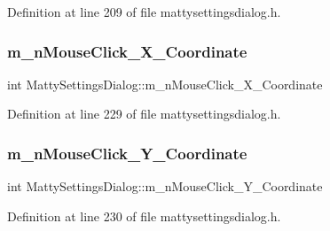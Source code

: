 Definition at line 209 of file mattysettingsdialog.\+h.

\hypertarget{classMattySettingsDialog_a0a19e3bafbfb97c643edfa372dd01795}{}\label{classMattySettingsDialog_a0a19e3bafbfb97c643edfa372dd01795} 
\subsubsection{\texorpdfstring{m\+\_\+n\+Mouse\+Click\+\_\+\+X\+\_\+\+Coordinate}{m\_nMouseClick\_X\_Coordinate}}
{\footnotesize\ttfamily int Matty\+Settings\+Dialog\+::m\+\_\+n\+Mouse\+Click\+\_\+\+X\+\_\+\+Coordinate\hspace{0.3cm}{\ttfamily [private]}}



Definition at line 229 of file mattysettingsdialog.\+h.

\hypertarget{classMattySettingsDialog_a7e437ff929a372a8a9bccdb8d3463b10}{}\label{classMattySettingsDialog_a7e437ff929a372a8a9bccdb8d3463b10} 
\subsubsection{\texorpdfstring{m\+\_\+n\+Mouse\+Click\+\_\+\+Y\+\_\+\+Coordinate}{m\_nMouseClick\_Y\_Coordinate}}
{\footnotesize\ttfamily int Matty\+Settings\+Dialog\+::m\+\_\+n\+Mouse\+Click\+\_\+\+Y\+\_\+\+Coordinate\hspace{0.3cm}{\ttfamily [private]}}



Definition at line 230 of file mattysettingsdialog.\+h.

\hypertarget{classMattySettingsDialog_a9624c1cd6a36fd847717294aa124b9d3}{}\label{classMattySettingsDialog_a9624c1cd6a36fd847717294aa124b9d3} 

